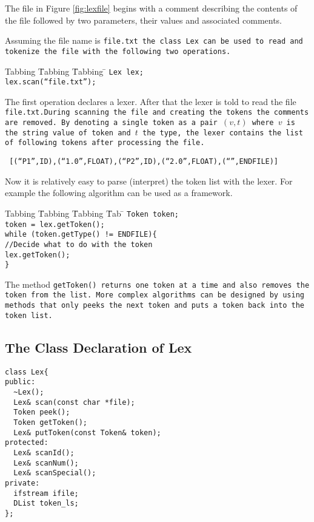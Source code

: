 The file in Figure \ref{fig:lexfile} begins with a comment describing
the contents of the file followed by two parameters, their values
and associated comments.
 
Assuming the file name is \tt file.txt \rm the class \tt Lex \rm can 
be used to read and tokenize the file
with the following two operations.

\begin{tabbing}
Tabbing \= Tabbing \= Tabbing \= \kill
\>\>\>\tt Lex lex; \\
\>\>\>\tt lex.scan(``file.txt'');
\end{tabbing}

The first operation declares a lexer. After that the lexer is
told to read the file \tt file.txt.\rm During scanning the file     
and creating the tokens the comments are removed. By denoting a single token 
as a pair $(v,t)$ where $v$ is the string value of token and $t$ the type,
the lexer contains the list of following tokens after processing the file.
\begin{center}
\tt 
[(``P1'',ID),(``1.0'',FLOAT),(``P2'',ID),(``2.0'',FLOAT),(``'',ENDFILE)]
\rm
\end{center}

Now it is relatively easy to parse (interpret) the token list 
with the lexer. For example the following algorithm can be used 
as a framework.

\begin{tabbing}
Tabbing \= Tabbing \= Tabbing \= Tab \= \kill
\>\>\>\tt Token token; \\
\>\>\>\tt token = lex.getToken(); \\  
\>\>\>\tt while (token.getType() != ENDFILE)\{\\
\>\>\>\>\tt //Decide what to do with the token\\
\>\>\>\>\tt lex.getToken();\\
\>\>\>\tt \}
\end{tabbing}

The method \tt getToken() \rm returns one token at a time and
also removes the token from the list. More complex algorithms can
be designed by using methods that only peeks the next token
and puts a token back into the token list.

\subsection{The Class Declaration of Lex}
\begin{verbatim}
class Lex{
public:
  ~Lex();
  Lex& scan(const char *file);
  Token peek();
  Token getToken();
  Lex& putToken(const Token& token);
protected:
  Lex& scanId();
  Lex& scanNum();
  Lex& scanSpecial();
private:
  ifstream ifile;
  DList token_ls;
};
\end{verbatim}

